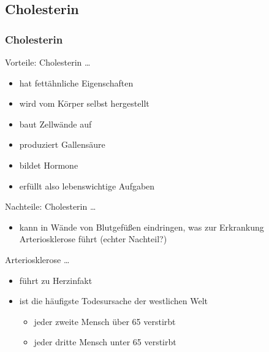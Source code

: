 \documentclass[xcolor=dvipsnames]{beamer}
\begin{document}
    \subsection{Cholesterin}
    \begin{frame}[allowframebreaks]
        \frametitle{Cholesterin}

        \begin{block}{Vorteile: Cholesterin \ldots}
            \begin{itemize}
                \setlength\itemsep{1em}
                \item hat fettähnliche Eigenschaften
                \item wird vom Körper selbst hergestellt
                \item baut Zellwände auf
                \item produziert Gallensäure
                \item bildet Hormone
                \item erfüllt also lebenswichtige Aufgaben
            \end{itemize}
        \end{block}

        \framebreak

        \begin{block}{Nachteile: Cholesterin \ldots}
            \begin{itemize}
                \setlength\itemsep{1em}
                \item kann in Wände von Blutgefüßen eindringen, was zur Erkrankung Arteriosklerose führt (echter Nachteil?)
            \end{itemize}
        \end{block}

        \begin{block}{Arteriosklerose \ldots}
            \begin{itemize}
                \setlength\itemsep{1em}
                \item führt zu Herzinfakt
                \item ist die häufigste Todesursache der westlichen Welt
                \begin{itemize}
                    \item jeder zweite Mensch über 65 verstirbt
                    \item jeder dritte Mensch unter 65 verstirbt
                \end{itemize}
            \end{itemize}
        \end{block}


\end{frame}
\end{document}
